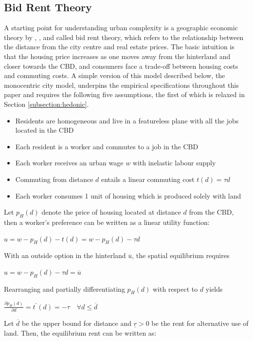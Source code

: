 \documentclass{article}
\begin{document}
\subsection{Bid Rent Theory} \label{subsection:monocentric}
A starting point for understanding urban complexity is a geographic economic theory by \citet{AlonsoWilliam1964Lalu}, \citet{MuthRichardF.1969Cah:}, and \citet{MillsEdwinSmith1972Sits} called bid rent theory, which refers to the relationship between the distance from the city centre and real estate prices. The basic intuition is that the housing price increases as one moves away from the hinterland and closer towards the CBD, and consumers face a trade-off between housing costs and commuting costs. A simple version of this model described below, the monocentric city model, underpins the empirical specifications throughout this paper and requires the following five assumptions, the first of which is relaxed in Section \ref{subsection:hedonic}.
\begin{itemize}
\setlength\itemsep{0.1em}
\item Residents are homogeneous and live in a featureless plane with all the jobs located in the CBD
\item Each resident is a worker and commutes to a job in the CBD
\item Each worker receives an urban wage $w$ with inelastic labour supply
\item Commuting from distance $d$ entails a linear commuting cost $t(d) = \tau d$
\item Each worker consumes 1 unit of housing which is produced solely  with land
\end{itemize}
Let $p_H (d)$ denote the price of housing located at distance $d$ from the CBD, then a worker's preference can be written as a linear utility function:
\begin{center}
$u = w - p _ { H } ( d ) - t ( d ) = w - p _ { H } ( d ) - \tau d$
\end{center}
With an outside option in the hinterland $\overline{u}$, the spatial equilibrium requires
\begin{center}
$u = w - p _ { H } ( d ) - \tau d = \overline { u }$
\end{center}
Rearranging and partially differentiating $p_H (d)$ with respect to $d$ yields 
\begin{center}
$\frac { \partial p _ { H } ( d ) } { \partial d } = t ^ { \prime } ( d ) = - \tau \quad \forall d \leq \overline { d }$
\end{center}
Let $\overline{d}$ be the upper bound for distance and $\underline{r} > 0$ be the rent for alternative use of land. Then, the equilibrium rent can be written as:
\end{document}
